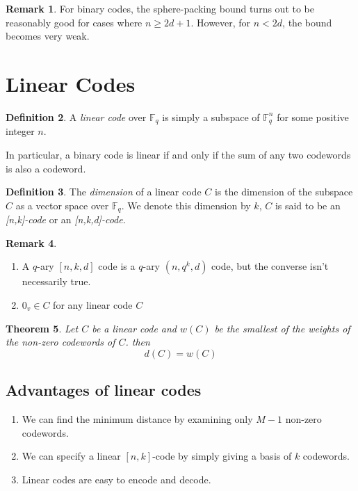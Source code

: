 \documentclass[11pt,a4paper]{article}
\theoremstyle{definition}
\newtheorem{definition}{Definition}[section]
\newtheorem{remark}[definition]{Remark}
\theoremstyle{plain}
\newtheorem{theorem}[definition]{Theorem}
\theoremstyle{remark}
\begin{document}
\begin{remark}
    For binary codes, the sphere-packing bound turns out to be reasonably good for cases where $n \geq 2d + 1$. 
    However, for $n < 2d$, the bound becomes very weak. 
\end{remark}

\section{Linear Codes}

\begin{definition}
    A \emph{linear code} over $\mathbb{F}_q$ is simply a subspace of $\mathbb{F}_q^n$ for some positive integer $n$.
\end{definition}

In particular, a binary code is linear if and only if the sum of any two codewords is also a codeword.

\begin{definition}
    The \emph{dimension} of a linear code $C$ is the dimension of the subspace $C$ as a vector space over $\mathbb{F}_q$. 
    We denote this dimension by $k$, $C$ is said to be an \emph{[n,k]-code} or an \emph{[n,k,d]-code}.
\end{definition}

\begin{remark}
    \begin{enumerate}[label = (\roman*)]
        \item A $q$-ary $[n,k,d]$ code is a $q$-ary $(n, q^k, d)$ code, but the converse isn't necessarily true.
        \item $0_v \in C$ for any linear code $C$
    \end{enumerate}
\end{remark}

\begin{theorem}\label{thm:linear-code-dist}
    Let $C$ be a linear code and $w(C)$ be the smallest of the weights of the non-zero codewords of $C$. then
    $$d(C) = w(C)$$
\end{theorem}

\subsection{Advantages of linear codes}
\begin{enumerate}[label = \roman*)]
    \item We can find the minimum distance by examining only $M-1$ non-zero codewords. 
    \item We can specify a linear $[n,k]$-code by simply giving a basis of $k$ codewords.
    \item Linear codes are easy to encode and decode.
\end{enumerate}
\end{document}
